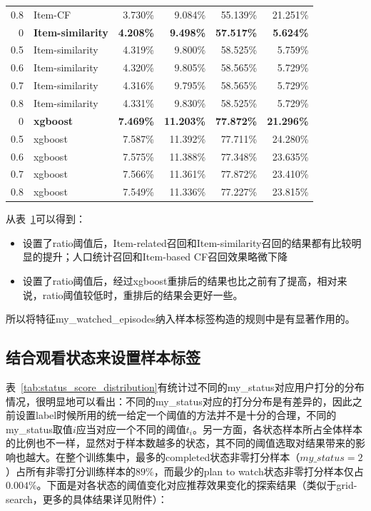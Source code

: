 \begin{table}[htbp]
{\begin{tabular}{rlrrrr}
			0.8  & Item-CF & 3.730\% & 9.084\% & 55.139\% & 21.251\% \\
			0    & \textbf{Item-similarity} & \textbf{4.208\%} & \textbf{9.498\%} & \textbf{57.517\%} & \textbf{5.624\%} \\
			0.5  & Item-similarity & 4.319\% & 9.800\% & 58.525\% & 5.759\% \\
			0.6  & Item-similarity & 4.320\% & 9.805\% & 58.565\% & 5.729\% \\
			0.7  & Item-similarity & 4.316\% & 9.795\% & 58.565\% & 5.729\% \\
			0.8  & Item-similarity & 4.331\% & 9.830\% & 58.525\% & 5.729\% \\
			0    & \textbf{xgboost} & \textbf{7.469\%} & \textbf{11.203\%} & \textbf{77.872\%} & \textbf{21.296\%} \\
			0.5  & xgboost & 7.587\% & 11.392\% & 77.711\% & 24.280\% \\
			0.6  & xgboost & 7.575\% & 11.388\% & 77.348\% & 23.635\% \\
			0.7  & xgboost & 7.566\% & 11.361\% & 77.872\% & 23.410\% \\
			0.8  & xgboost & 7.549\% & 11.336\% & 77.227\% & 23.815\% \\
			\bottomrule
	\end{tabular}}%
	\label{tab:watched_ratio_results}%
\end{table}%

从表~\ref{tab:watched_ratio_results}可以得到：
\begin{itemize}
	\item 设置了ratio阈值后，Item-related召回和Item-similarity召回的结果都有比较明显的提升；人口统计召回和Item-based CF召回效果略微下降
	\item 设置了ratio阈值后，经过xgboost重排后的结果也比之前有了提高，相对来说，ratio阈值较低时，重排后的结果会更好一些。
\end{itemize}

所以将特征my\_watched\_episodes纳入样本标签构造的规则中是有显著作用的。

\subsection{结合观看状态来设置样本标签}
表~\ref{tab:status_score_distribution}有统计过不同的my\_status对应用户打分的分布情况，很明显地可以看出：不同的my\_status对应的打分分布是有差异的，因此之前设置label时候所用的统一给定一个阈值的方法并不是十分的合理，不同的my\_status取值$i$应当对应一个不同的阈值$t_i$。另一方面，各状态样本所占全体样本的比例也不一样，显然对于样本数越多的状态，其不同的阈值选取对结果带来的影响也越大。在整个训练集中，最多的completed状态非零打分样本（$my\_status=2$）占所有非零打分训练样本的$89\%$，而最少的plan to watch状态非零打分样本仅占$0.004\%$。下面是对各状态的阈值变化对应推荐效果变化的探索结果（类似于grid-search，更多的具体结果详见附件）：

